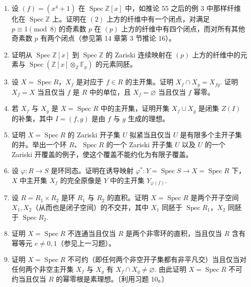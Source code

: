 \begin{enumerate}
\item 设 \((f) = (x^4+1)\) 在 \(\operatorname{Spec}\mathbb{Z}[x]\) 中，如推论 55 之后的例 3 中那样纤维化在 \(\operatorname{Spec}\mathbb{Z}\) 上。证明在 \((2)\) 上方的纤维中有一个闭点，对满足 \(p \equiv 1 \pmod 8\) 的奇素数 \(p\) 在 \((p)\) 上方的纤维中有四个闭点，而对所有其他奇素数 \(p\) 有两个闭点（参见第 14 章第 3 节推论 16）。

\item 证明从 \(\operatorname{Spec}\mathbb{Z}[x]\) 到 \(\operatorname{Spec}\mathbb{Z}\) 的 Zariski 连续映射在 \((p)\) 上方的纤维中的元素与 \(\operatorname{Spec}(\mathbb{Z}[x]\otimes_{\mathbb{Z}}\mathbb{F}_p)\) 的元素同胚。

\item 设 \(X = \operatorname{Spec}R\)，\(X_f\) 是对应于 \(f \in R\) 的主开集。证明 \(X_f \cap X_g = X_{fg}\). 证明 \(X_f = X\) 当且仅当 \(f\) 是 \(R\) 中的单位，且 \(X_f = \varnothing\) 当且仅当 \(f\) 幂零。

\item 若 \(X_f\) 与 \(X_g\) 是 \(X = \operatorname{Spec}R\) 中的主开集，证明开集 \(X_f \cup X_g\) 是闭集 \(Z(I)\) 的补集，其中 \(I = (f,g)\) 是由 \(f\) 与 \(g\) 生成的理想。

\item 证明 \(X = \operatorname{Spec}R\) 的 Zariski 开子集 \(U\) 拟紧当且仅当 \(U\) 是有限多个主开子集的并。举出一个环 \(R\)、\(\operatorname{Spec}R\) 的一个 Zariski 开子集 \(U\) 以及 \(U\) 的一个 Zariski 开覆盖的例子，使这个覆盖不能约化为有限子覆盖。

\item 设 \(\varphi : R \to S\) 是环同态。证明在诱导映射 \(\varphi^* : Y = \operatorname{Spec}S \to X = \operatorname{Spec}R\) 下，\(X\) 中主开集 \(X_f\) 的完全原像是 \(Y\) 中的主开集 \(Y_{\varphi(f)}\).

\item 设 \(R = R_1 \times R_2\) 是环 \(R_1\) 与 \(R_2\) 的直积。证明 \(X = \operatorname{Spec}R\) 是两个开子空间 \(X_1, X_2\)（从而也是闭子空间）的不交并，其中 \(X_1\) 同胚于 \(\operatorname{Spec}R_1\)，\(X_2\) 同胚于 \(\operatorname{Spec}R_2\).

\item 证明 \(X = \operatorname{Spec}R\) 不连通当且仅当 \(R\) 是两个非零环的直积，当且仅当 \(R\) 含有幂等元 \(e \neq 0, 1\)（参见上一习题）。

\item 证明 \(X = \operatorname{Spec}R\) 不可约（即任何两个非空开子集都有非平凡交）当且仅当对任何两个非空主开集 \(X_f\) 与 \(X_g\) 有 \(X_f \cap X_g \neq \varnothing\). 由此证明 \(X = \operatorname{Spec}R\) 不可约当且仅当 \(R\) 的幂零根是素理想。〔利用习题 10。〕


\end{enumerate}
